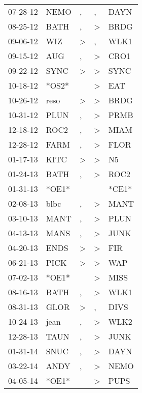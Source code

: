 \begin{supertabular}{lllll}
 07-28-12 &   NEMO &             , &             , &   DAYN \\
 08-25-12 &   BATH &             , &  \textgreater &   BRDG \\
 09-06-12 &    WIZ &  \textgreater &             , &   WLK1 \\
 09-15-12 &    AUG &             , &  \textgreater &   CRO1 \\
 09-22-12 &   SYNC &  \textgreater &  \textgreater &   SYNC \\
 10-18-12 &  *OS2* &               &  \textgreater &    EAT \\
 10-26-12 &   reso &  \textgreater &  \textgreater &   BRDG \\
 10-31-12 &   PLUN &             , &  \textgreater &   PRMB \\
 12-18-12 &   ROC2 &             , &  \textgreater &   MIAM \\
 12-28-12 &   FARM &             , &  \textgreater &   FLOR \\
 01-17-13 &   KITC &  \textgreater &  \textgreater &     N5 \\
 01-24-13 &   BATH &             , &  \textgreater &   ROC2 \\
 01-31-13 &  *OE1* &               &               &  *CE1* \\
 02-08-13 &   blbc &             , &  \textgreater &   MANT \\
 03-10-13 &   MANT &             , &  \textgreater &   PLUN \\
 04-13-13 &   MANS &             , &  \textgreater &   JUNK \\
 04-20-13 &   ENDS &  \textgreater &  \textgreater &    FIR \\
 06-21-13 &   PICK &  \textgreater &  \textgreater &    WAP \\
 07-02-13 &  *OE1* &               &  \textgreater &   MISS \\
 08-16-13 &   BATH &             , &  \textgreater &   WLK1 \\
 08-31-13 &   GLOR &  \textgreater &             , &   DIVS \\
 10-24-13 &   jean &             , &  \textgreater &   WLK2 \\
 12-28-13 &   TAUN &             , &  \textgreater &   JUNK \\
 01-31-14 &   SNUC &             , &  \textgreater &   DAYN \\
 03-22-14 &   ANDY &             , &  \textgreater &   NEMO \\
 04-05-14 &  *OE1* &               &  \textgreater &   PUPS \\

\end{supertabular}
